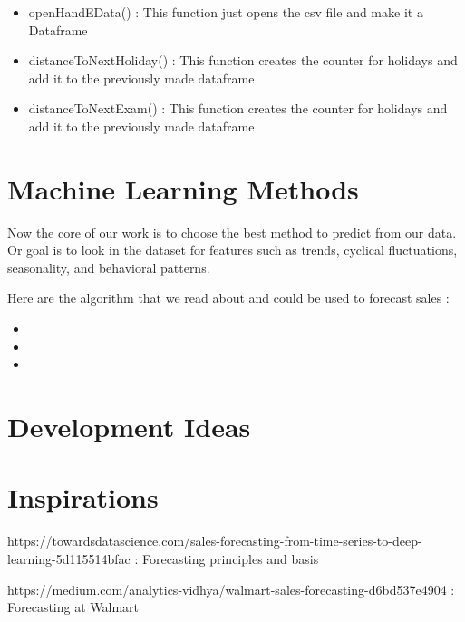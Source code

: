 \documentclass{report}
\begin{document}
\begin{itemize}
\item openHandEData() : This function just opens the csv file and make it a Dataframe
\item distanceToNextHoliday() : This function creates the counter for holidays and add it to the previously made dataframe
\item distanceToNextExam() : This function creates the counter for holidays and add it to the previously made dataframe
\end{itemize}



\chapter{Machine Learning Methods}

Now the core of our work is to choose the best method to predict from our data. Or goal is to look in the dataset for features such as trends, cyclical fluctuations, seasonality, and behavioral patterns.



Here are the algorithm that we read about and could be used to forecast sales :
\begin{itemize}
\item
\item
\item
\end{itemize}

\chapter{Development Ideas}



\chapter{Inspirations}

https://towardsdatascience.com/sales-forecasting-from-time-series-to-deep-learning-5d115514bfac : Forecasting principles and basis 

https://medium.com/analytics-vidhya/walmart-sales-forecasting-d6bd537e4904 : Forecasting at Walmart 
\end{document}
